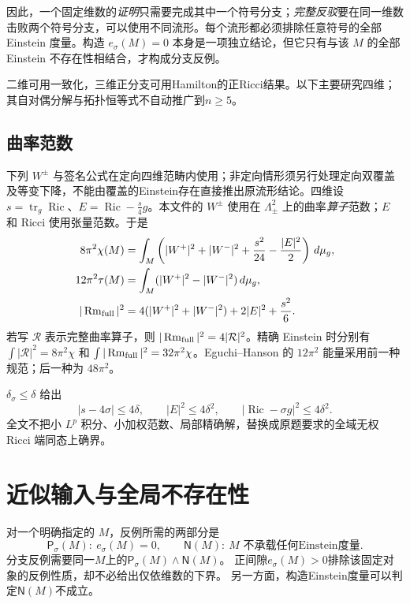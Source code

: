 \documentclass[UTF8,a4paper,11pt,fontset=fandol]{ctexart}
\numberwithin{equation}{section}
\theoremstyle{definition}
\newcommand{\Ric}{\operatorname{Ric}}
\newcommand{\Rm}{\operatorname{Rm}}
\newcommand{\tr}{\operatorname{tr}}
\newcommand{\dd}{\,d\mu_g}
\begin{document}
因此，一个固定维数的\emph{证明}只需要完成其中一个符号分支；\emph{完整反驳}要在同一维数击败两个符号分支，可以使用不同流形。每个流形都必须排除任意符号的全部 Einstein 度量。构造 $e_\sigma(M)=0$ 本身是一项独立结论，但它只有与该 $M$ 的全部 Einstein 不存在性相结合，才构成分支反例。

二维可用一致化，三维正分支可用Hamilton的正Ricci结果。以下主要研究四维；其自对偶分解与拓扑恒等式不自动推广到$n\ge5$。

\subsection{曲率范数}
下列 $W^\pm$ 与签名公式在定向四维范畴内使用；非定向情形须另行处理定向双覆盖及等变下降，不能由覆盖的Einstein存在直接推出原流形结论。四维设 $s=\tr_g\Ric$、$E=\Ric-\frac{s}{4}g$。本文件的 $W^\pm$ 使用在 $\Lambda^2_\pm$ 上的曲率\emph{算子}范数；$E$ 和 Ricci 使用张量范数。于是
\begin{align}
8\pi^2\chi(M)&=\int_M\left(|W^+|^2+|W^-|^2+\frac{s^2}{24}-\frac{|E|^2}{2}\right)\dd,\label{eq:CGB}\\
12\pi^2\tau(M)&=\int_M(|W^+|^2-|W^-|^2)\dd,\label{eq:signature}\\
|\Rm_{\rm full}|^2&=4(|W^+|^2+|W^-|^2)+2|E|^2+\frac{s^2}{6}.
\end{align}
若写 $\mathcal R$ 表示完整曲率算子，则 $|\Rm_{\rm full}|^2=4|\mathcal R|^2$。精确 Einstein 时分别有 $\int|\mathcal R|^2=8\pi^2\chi$ 和 $\int|\Rm_{\rm full}|^2=32\pi^2\chi$。Eguchi--Hanson 的 $12\pi^2$ 能量采用前一种规范；后一种为 $48\pi^2$。

$\delta_\sigma\le\delta$ 给出
\begin{equation}
 |s-4\sigma|\le4\delta,\qquad |E|^2\le4\delta^2,\qquad
 |\Ric-\sigma g|^2\le4\delta^2.
\end{equation}
全文不把小 $L^p$ 积分、小加权范数、局部精确解，替换成原题要求的全域无权 Ricci 端同态上确界。

\section{近似输入与全局不存在性}
对一个明确指定的 $M$，反例所需的两部分是
\[
\mathsf P_\sigma(M):\ e_\sigma(M)=0,
\qquad
\mathsf N(M):\ M\text{ 不承载任何Einstein度量}.
\]
分支反例需要同一$M$上的$\mathsf P_\sigma(M)\land\mathsf N(M)$。
正间隙$e_\sigma(M)>0$排除该固定对象的反例性质，却不必给出仅依维数的下界。
另一方面，构造Einstein度量可以判定$\mathsf N(M)$不成立。
\end{document}
